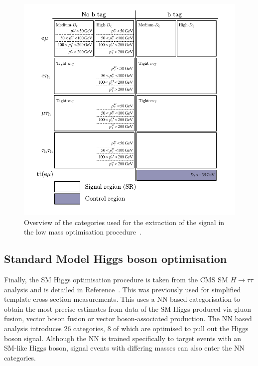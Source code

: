 \begin{figure}[!hbtp]
\centering
    \includegraphics[width=\textwidth]{Figures/low_mass_categories.pdf}
\caption[Diagram of the categories in the low-mass optimisation procedure.]{Overview of the categories used for the extraction of the signal in the low mass optimisation procedure~\cite{CMS:2022rbd}.}
\label{fig:low_mass_categories}
\end{figure}

\subsection{Standard Model Higgs boson optimisation}

Finally, the \ac{SM} Higgs optimisation procedure is taken from the \ac{CMS} \ac{SM} $H \rightarrow \tau\tau$ analysis and is detailed in Reference~\cite{CMS:2022kdi}.
This was previously used for simplified template cross-section measurements.
This uses a \ac{NN}-based categorisation to obtain the most precise estimates from data of the \ac{SM} Higgs produced via gluon fusion, vector boson fusion or vector boson-associated production.
The \ac{NN} based analysis introduces 26 categories, 8 of which are optimised to pull out the Higgs boson signal.
Although the \ac{NN} is trained specifically to target events with an \ac{SM}-like Higgs boson, signal events with differing masses can also enter the \ac{NN} categories.

